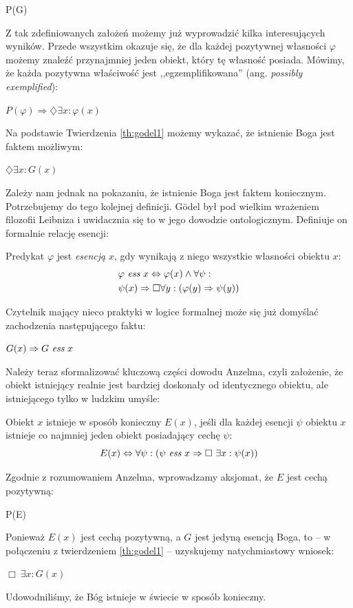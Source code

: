 \documentclass[12pt]{article}
\begin{document}
\begin{multicols}{2}
\begin{axiom-g} \label{axiom:godel4}
	P(G)
\end{axiom-g}
Z tak zdefiniowanych założeń możemy już wyprowadzić kilka interesujących wyników. Przede wszystkim okazuje się, że dla każdej pozytywnej własności $\varphi$ możemy znaleźć przynajmniej jeden obiekt, który tę własność posiada. Mówimy, że każda pozytywna właściwość jest ,,egzemplifikowana'' (ang. \emph{possibly exemplified}):
\begin{theorem-g} \label{th:godel1}
	$P(\varphi) \Rightarrow \diamondsuit \exists x: \varphi(x)$
\end{theorem-g}
Na podstawie Twierdzenia \ref{th:godel1} możemy wykazać, że istnienie Boga jest faktem możliwym:
\begin{theorem-g} \label{th:godel2}
	$\diamondsuit \exists x: G(x)$
\end{theorem-g}
Zależy nam jednak na pokazaniu, że istnienie Boga jest faktem koniecznym. Potrzebujemy do tego kolejnej definicji. G\"odel był pod wielkim wrażeniem filozofii Leibniza i uwidacznia się to w jego dowodzie ontologicznym. Definiuje on formalnie relację esencji:
\begin{definition-g}
	Predykat $\varphi$ jest \emph{esencją} $x$, gdy wynikają z niego wszystkie własności obiektu $x$:
	\begin{align*}
	& \varphi\ \emph{ess}\ x \Leftrightarrow \varphi(x) \wedge \forall \psi: \\ 
	& \psi(x) \Rightarrow \Box \forall y: \left( \varphi(y) \Rightarrow \psi(y) \right)
	\end{align*}
\end{definition-g}
Czytelnik mający nieco praktyki w logice formalnej może się już domyślać zachodzenia następującego faktu:
\begin{corollary}
	$G(x) \Rightarrow G\ \emph{ess}\ x$
\end{corollary}
Należy teraz sformalizować kluczową części dowodu Anzelma, czyli założenie, że obiekt istniejący realnie jest bardziej doskonały od identycznego obiektu, ale istniejącego tylko w ludzkim umyśle: 
\begin{definition-g}
	Obiekt $x$ istnieje w sposób konieczny $E(x)$, jeśli dla każdej esencji $\psi$ obiektu $x$ istnieje co najmniej jeden obiekt posiadający cechę $\psi$:
	\begin{equation*}
	E(x) \Leftrightarrow \forall \psi: \left( \psi\ \emph{ess}\ x \Rightarrow\Box\ \exists x: \psi(x) \right)
	\end{equation*}
\end{definition-g}
Zgodnie z rozumowaniem Anzelma, wprowadzamy aksjomat, że $E$ jest cechą pozytywną:
\begin{axiom-g}
	P(E)
\end{axiom-g}
Ponieważ $E(x)$ jest cechą pozytywną, a $G$ jest jedyną esencją Boga, to -- w połączeniu z twierdzeniem \ref{th:godel1} -- uzyskujemy natychmiastowy wniosek:
\begin{theorem-g} \label{th:goedel3}
	$\Box\ \exists x: G(x)$
\end{theorem-g}
Udowodniliśmy, że Bóg istnieje w świecie w sposób konieczny. 


\end{multicols}
\end{document}
